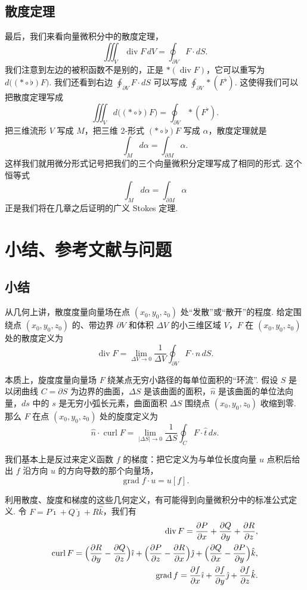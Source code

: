 \subsection{散度定理}

最后，我们来看向量微积分中的散度定理，
\[
\iiint_V\operatorname{div}F\,dV=\oint_{\partial V}F\cdot dS.
\]
我们注意到左边的被积函数不是别的，正是 $\ast(\operatorname{div}F)$，它可以重写为 $d\bigl((\ast\circ\flat)F\bigr)$. 我们还看到右边 $\oint_{\partial V}F\cdot dS$ 可以写成 $\oint_{\partial V}\ast(F^{\flat})$. 这使得我们可以把散度定理写成
\[
\iiint_V d\bigl((\ast\circ\flat)F\bigr)=\oint_{\partial V}\ast(F^{\flat}).
\]
把三维流形 $V$ 写成 $M$，把三维 2-形式 $(\ast\circ\flat)F$ 写成 $\alpha$，散度定理就是
\[
\int_M d\alpha=\int_{\partial M}\alpha.
\]
这样我们就用微分形式记号把我们的三个向量微积分定理写成了相同的形式. 这个恒等式
\[
\int_M d\alpha=\int_{\partial M}\alpha
\]
正是我们将在几章之后证明的广义 Stokes 定理.

\section{小结、参考文献与问题}

\subsection{小结}

从几何上讲，散度度量向量场在点 $(x_0,y_0,z_0)$ 处``发散''或``散开''的程度. 给定围绕点 $(x_0,y_0,z_0)$ 的、带边界 $\partial V$ 和体积 $\Delta V$ 的小三维区域 $V$，$F$ 在 $(x_0,y_0,z_0)$ 处的散度定义为
\[
\operatorname{div}F=\lim_{\Delta V\to0}\frac{1}{\Delta V}\oint_{\partial V}F\cdot\hat{n}\,dS.
\]

本质上，旋度度量向量场 $F$ 绕某点无穷小路径的每单位面积的``环流''. 假设 $S$ 是以闭曲线 $C=\partial S$ 为边界的曲面，$\Delta S$ 是该曲面的面积，$\hat{n}$ 是该曲面的单位法向量，$ds$ 中的 $s$ 是无穷小弧长元素，曲面面积 $\Delta S$ 围绕点 $(x_0,y_0,z_0)$ 收缩到零. 那么 $F$ 在点 $(x_0,y_0,z_0)$ 处的旋度定义为
\[
\hat{n}\cdot\operatorname{curl}F=\lim_{|\Delta S|\to0}\frac{1}{\Delta S}\oint_C F\cdot\hat{t}\,ds.
\]

我们基本上是反过来定义函数 $f$ 的梯度：把它定义为与单位长度向量 $u$ 点积后给出 $f$ 沿方向 $u$ 的方向导数的那个向量场，
\[
\operatorname{grad}f\cdot u=u[f].
\]

利用散度、旋度和梯度的这些几何定义，有可能得到向量微积分中的标准公式定义. 令 $F=P\hat{\imath}+Q\hat{\jmath}+R\hat{k}$，我们有
\begin{align*}
\operatorname{div}F=\frac{\partial P}{\partial x}+\frac{\partial Q}{\partial y}+\frac{\partial R}{\partial z}, \\
\operatorname{curl}F=\Bigl(\frac{\partial R}{\partial y}-\frac{\partial Q}{\partial z}\Bigr)\hat{\imath}+\Bigl(\frac{\partial P}{\partial z}-\frac{\partial R}{\partial x}\Bigr)\hat{\jmath}+\Bigl(\frac{\partial Q}{\partial x}-\frac{\partial P}{\partial y}\Bigr)\hat{k}, \\
\operatorname{grad}f=\frac{\partial f}{\partial x}\hat{\imath}+\frac{\partial f}{\partial y}\hat{\jmath}+\frac{\partial f}{\partial z}\hat{k}.
\end{align*}

